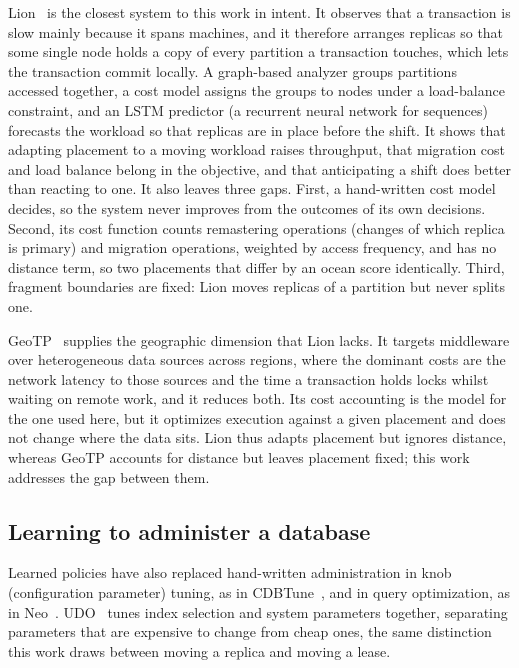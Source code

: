 Lion~\cite{lion2024} is the closest system to this work in intent. It observes
that a transaction is slow mainly because it spans machines, and it therefore
arranges replicas so that some single node holds a copy of every partition a
transaction touches, which lets the transaction commit locally. A graph-based
analyzer groups partitions accessed together, a cost model assigns the groups
to nodes under a load-balance constraint, and an LSTM predictor (a recurrent
neural network for sequences) forecasts the workload so that replicas are in
place before the shift. It shows
that adapting placement to a moving workload raises throughput, that migration
cost and load balance belong in the objective, and that anticipating a shift
does better than reacting to one. It also leaves three gaps. First, a
hand-written cost model decides, so the system never improves from the outcomes
of its own decisions. Second, its cost function counts remastering operations
(changes of which replica is primary) and migration operations, weighted by
access frequency, and has no distance term, so two placements that differ by an
ocean score identically. Third, fragment boundaries are fixed: Lion moves
replicas of a partition but never splits one.

GeoTP~\cite{geotp2025} supplies the geographic dimension that Lion lacks. It
targets middleware over heterogeneous data sources across regions, where the
dominant costs are the network latency to those sources and the time a
transaction holds locks whilst waiting on remote work, and it reduces both. Its cost
accounting is the model for the one used here, but it optimizes execution
against a given placement and does not change where the data sits. Lion thus
adapts placement but ignores distance, whereas GeoTP accounts for distance but
leaves placement fixed; this work addresses the gap between them.

\subsection{Learning to administer a database}

Learned policies have also replaced hand-written administration in knob
(configuration parameter) tuning, as in CDBTune~\cite{zhang2019cdbtune}, and in
query optimization, as in Neo~\cite{marcus2019neo}. UDO~\cite{wang2021udo}
tunes index selection and system parameters together, separating parameters
that are expensive to change from cheap ones, the same distinction this work
draws between moving a replica and moving a lease.

